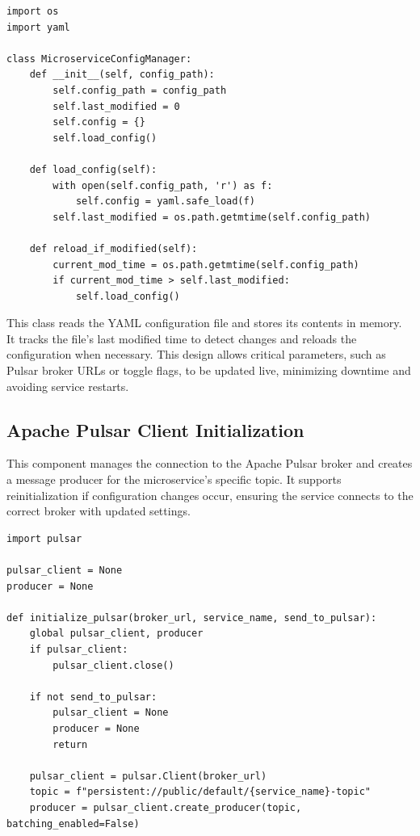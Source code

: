 \begin{lstlisting}[breaklines=true,basicstyle=\small\ttfamily,frame=single]
import os
import yaml

class MicroserviceConfigManager:
    def __init__(self, config_path):
        self.config_path = config_path
        self.last_modified = 0
        self.config = {}
        self.load_config()

    def load_config(self):
        with open(self.config_path, 'r') as f:
            self.config = yaml.safe_load(f)
        self.last_modified = os.path.getmtime(self.config_path)

    def reload_if_modified(self):
        current_mod_time = os.path.getmtime(self.config_path)
        if current_mod_time > self.last_modified:
            self.load_config()
\end{lstlisting}

This class reads the YAML configuration file and stores its contents in memory. It tracks the file’s last modified time to detect changes and reloads the configuration when necessary. This design allows critical parameters, such as Pulsar broker URLs or toggle flags, to be updated live, minimizing downtime and avoiding service restarts.

\subsection{Apache Pulsar Client Initialization}
This component manages the connection to the Apache Pulsar broker and creates a message producer for the microservice’s specific topic. It supports reinitialization if configuration changes occur, ensuring the service connects to the correct broker with updated settings.

\begin{lstlisting}[breaklines=true,basicstyle=\small\ttfamily,frame=single]
import pulsar

pulsar_client = None
producer = None

def initialize_pulsar(broker_url, service_name, send_to_pulsar):
    global pulsar_client, producer
    if pulsar_client:
        pulsar_client.close()

    if not send_to_pulsar:
        pulsar_client = None
        producer = None
        return

    pulsar_client = pulsar.Client(broker_url)
    topic = f"persistent://public/default/{service_name}-topic"
    producer = pulsar_client.create_producer(topic, batching_enabled=False)
\end{lstlisting}

